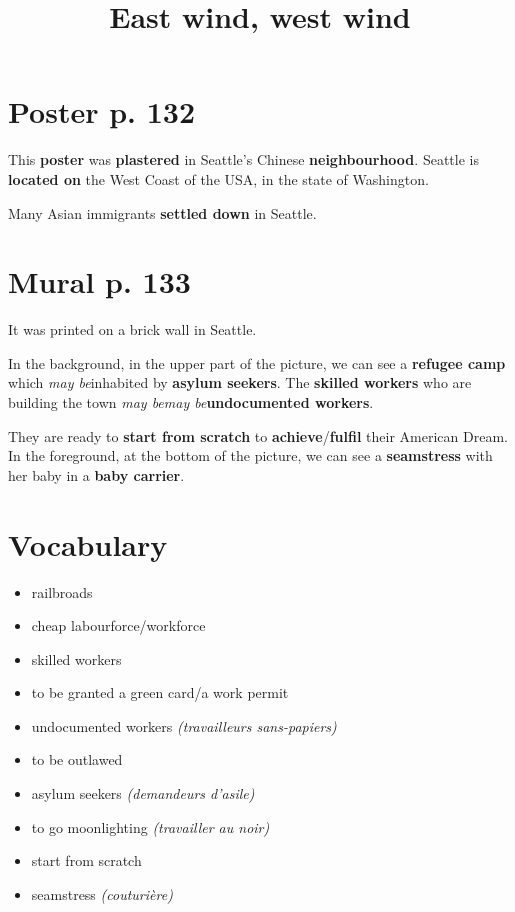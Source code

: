 \documentclass[12pt]{article}
\title{\textbf{East wind, west wind}}
\date{}
\begin{document}
\maketitle

\section{Poster p. 132}

This \textbf{poster} was \textbf{plastered} in Seattle's Chinese \textbf{neighbourhood}. Seattle is \textbf{located on} the West Coast of the USA, in the state of Washington.

Many Asian immigrants \textbf{settled down} in Seattle.

\section{Mural p. 133}

It was printed on a brick wall in Seattle.

In the background, in the upper part of the picture, we can see a \textbf{refugee camp} which \textit{may be}\footnotemark[1] inhabited by \textbf{asylum seekers}. The \textbf{skilled workers} who are building the town \textit{may be}\textit{may be}\footnotemark[1] \textbf{undocumented workers}.

They are ready to \textbf{start from scratch} to \textbf{achieve}/\textbf{fulfil} their American Dream. In the foreground, at the bottom of the picture, we can see a \textbf{seamstress} with her baby in a \textbf{baby carrier}.

\appendix
\section*{Vocabulary}

\begin{itemize}
\item railbroads
\item cheap labourforce/workforce
\item skilled workers
\item to be granted a green card/a work permit
\item undocumented workers \textit{(travailleurs sans-papiers)}
\item to be outlawed
\item asylum seekers \textit{(demandeurs d'asile)}
\item to go moonlighting \textit{(travailler au noir)}
\item start from scratch
\item seamstress \textit{(couturière)}
\end{itemize}
\end{document}
